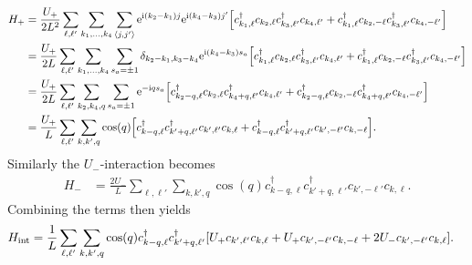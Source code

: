 \documentclass[english, parskip=full]{scrartcl}
\begin{document}
\begin{align}
H_+ &= \frac{U_+}{2L^2} \sum_{\ell,\ell'} \sum_{k_1,\dots,k_4} \sum_{\bra*{j,j'}} \powe{\i (k_2-k_1) j} \powe{\i (k_4-k_3) j'} \klb*{c_{k_1,\ell}^\dagger c_{k_2,\ell} c_{k_3,\ell'}^\dagger c_{k_4,\ell'} + c_{k_1,\ell}^\dagger c_{k_2,-\ell} c_{k_3,\ell'}^\dagger c_{k_4,-\ell'}}\\
&= \frac{U_+}{2L} \sum_{\ell,\ell'} \sum_{k_1,\dots,k_4} \sum_{s_a=\pm 1} \delta_{k_2-k_1,k_3-k_4} \powe{\i (k_4-k_3) s_a} \klb*{c_{k_1,\ell}^\dagger c_{k_2,\ell} c_{k_3,\ell'}^\dagger c_{k_4,\ell'} + c_{k_1,\ell}^\dagger c_{k_2,-\ell} c_{k_3,\ell'}^\dagger c_{k_4,-\ell'}}\\
&= \frac{U_+}{2L} \sum_{\ell,\ell'} \sum_{k_2,k_4,q} \sum_{s_a=\pm 1} \powe{-\i q s_a} \klb*{c_{k_2-q,\ell}^\dagger c_{k_2,\ell} c_{k_4+q,\ell'}^\dagger c_{k_4,\ell'} + c_{k_2-q,\ell}^\dagger c_{k_2,-\ell} c_{k_4+q,\ell'}^\dagger c_{k_4,-\ell'} }\\
&= \frac{U_+}{L} \sum_{\ell,\ell'} \sum_{k,k',q} \cos(q) \klb*{c_{k-q,\ell}^\dagger c_{k'+q,\ell'}^\dagger c_{k',\ell'} c_{k,\ell} + c_{k-q,\ell}^\dagger c_{k'+q,\ell'}^\dagger c_{k',-\ell'}c_{k,-\ell} }.
\end{align}
Similarly the $U_-$-interaction becomes
\begin{align}
H_- &= \frac{2U_-}{L} \sum_{\ell,\ell'} \sum_{k,k',q} \cos(q) c_{k-q,\ell}^\dagger c_{k'+q,\ell'}^\dagger c_{k',-\ell'} c_{k,\ell}.
\end{align}
Combining the terms then yields
\begin{align}
H_\Text{int} &= \frac{1}{L} \sum_{\ell,\ell'} \sum_{k,k',q} \cos (q) c_{k-q,\ell}^\dagger c_{k'+q,\ell'}^\dagger \klb*{U_+ c_{k',\ell'} c_{k,\ell} + U_+ c_{k',-\ell'} c_{k,-\ell} + 2U_- c_{k',-\ell'} c_{k,\ell}}.
\end{align}
\end{document}
